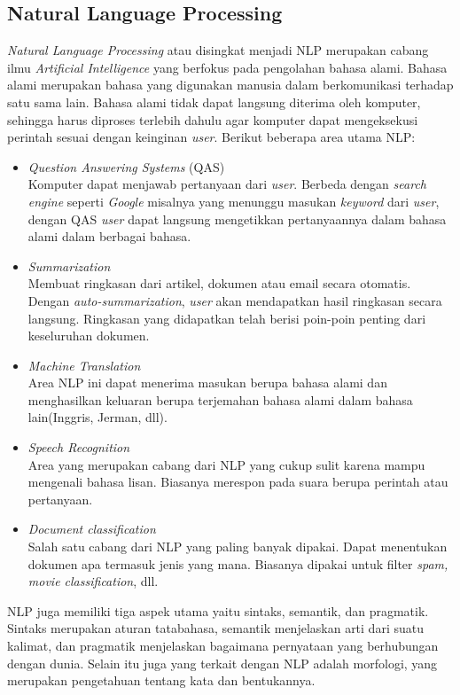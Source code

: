 \subsection{Natural Language Processing}
\label{sec:nlp}

\textit{Natural Language Processing}\cite{NLA:2003} atau disingkat menjadi NLP merupakan cabang ilmu \textit{Artificial Intelligence} yang berfokus pada pengolahan bahasa alami. Bahasa alami merupakan bahasa yang digunakan manusia dalam berkomunikasi terhadap satu sama lain. Bahasa alami tidak dapat langsung diterima oleh komputer, sehingga harus diproses terlebih dahulu agar komputer dapat mengeksekusi perintah sesuai dengan keinginan \textit{user}.  Berikut beberapa area utama NLP:

\begin{itemize}
	\item \textit{Question Answering Systems} (QAS)\\
	Komputer dapat menjawab pertanyaan dari \textit{user}. Berbeda dengan \textit{search engine} seperti \textit{Google} misalnya yang menunggu masukan \textit{keyword} dari \textit{user}, dengan QAS \textit{user} dapat langsung mengetikkan pertanyaannya dalam bahasa alami dalam berbagai bahasa.
	\item \textit{Summarization}\\
	Membuat ringkasan dari artikel, dokumen atau email secara otomatis. Dengan \textit{auto-summarization}, \textit{user} akan mendapatkan hasil ringkasan secara langsung. Ringkasan yang didapatkan telah berisi poin-poin penting dari keseluruhan dokumen.
	\item \textit{Machine Translation}\\
	Area NLP ini dapat menerima masukan berupa bahasa alami dan menghasilkan keluaran berupa terjemahan bahasa alami dalam bahasa lain(Inggris, Jerman, dll).
	\item \textit{Speech Recognition}\\
	Area yang merupakan cabang dari NLP yang cukup sulit karena mampu mengenali bahasa lisan. Biasanya merespon pada suara berupa perintah atau pertanyaan.
	\item \textit{Document classification}\\
	Salah satu cabang dari NLP yang paling banyak dipakai. Dapat menentukan dokumen apa termasuk jenis yang mana. Biasanya dipakai untuk filter \textit{spam, movie classification}, dll.
\end{itemize}

NLP juga memiliki tiga aspek utama yaitu sintaks, semantik, dan pragmatik. Sintaks merupakan aturan tatabahasa, semantik menjelaskan arti dari suatu kalimat, dan pragmatik menjelaskan bagaimana pernyataan yang berhubungan dengan dunia. Selain itu juga yang terkait dengan NLP adalah morfologi, yang merupakan pengetahuan tentang kata dan bentukannya.

